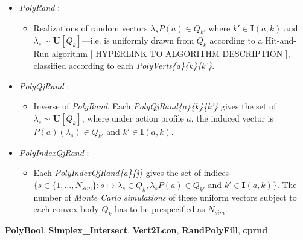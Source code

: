 \documentclass[a4paper,10pt,english]{sphinxmanual}
\begin{document}
{\begin{minipage}{0.95\linewidth}
\begin{fulllineitems}
\begin{itemize}
\begin{itemize}
\end{itemize}

\item {} 
\emph{PolyRand} :
\begin{itemize}
\item {} 
Realizations of random vectors $\lambda_{s}P(a) \in Q_{k'}$ where $k' \in \mathbf{I}(a,k)$ and $\lambda_{s} \sim \textbf{U}[Q_{k}]$---i.e. is uniformly drawn  from $Q_{k}$ according to a Hit-and-Run algorithm {[} HYPERLINK TO ALGORITHM DESCRIPTION {]}, classified according to each \emph{PolyVerts\{a\}\{k\}\{k'\}}.

\end{itemize}

\item {} 
\emph{PolyQjRand} :
\begin{itemize}
\item {} 
Inverse of \emph{PolyRand}. Each \emph{PolyQjRand\{a\}\{k\}\{k'\}} gives the set of $\lambda_{s} \sim \textbf{U}[Q_{k}]$, where under action profile $a$, the induced vector is $P(a)(\lambda_{s}) \in Q_{k'}$ and $k' \in \mathbf{I}(a,k)$.

\end{itemize}

\item {} 
\emph{PolyIndexQjRand} :
\begin{itemize}
\item {} 
Each \emph{PolyIndexQjRand\{a\}\{j\}} gives the set of indices $\{
s \in \{1,...,N_{sim}\} : s \mapsto \lambda_{s} \in Q_{k}, \lambda_{s}P(a) \in Q_{k'}  \text{ and } k' \in \mathbf{I}(a,k)  \}$. The number of \emph{Monte Carlo simulations} of these uniform vectors subject to each convex body $Q_k$ has to be prespecified as $N_{sim}$.

\end{itemize}

\end{itemize}

\end{fulllineitems}





\textbf{PolyBool}, \textbf{Simplex\_Intersect}, \textbf{Vert2Lcon}, \textbf{RandPolyFill}, \textbf{cprnd}


\end{minipage}}
\begin{center}\setlength{\fboxsep}{5pt}\end{center}
\end{document}
